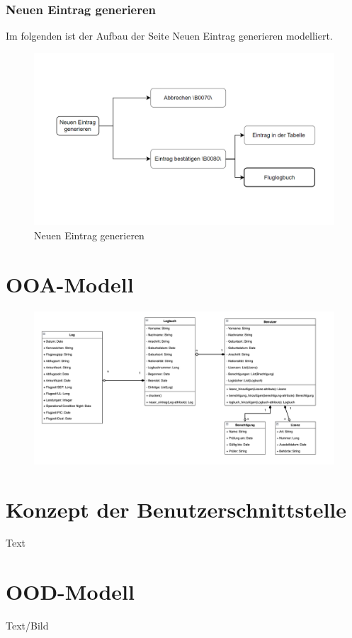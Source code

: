 \documentclass[a4paper]{article} %
\begin{document}
    \subsubsection{Neuen Eintrag generieren}
    \vspace{0.5cm}
    Im folgenden ist der Aufbau der Seite \glqq{}Neuen Eintrag generieren\grqq{} modelliert.
    \begin{figure}[h!]
        \centering
        \includegraphics{Benutzeroberflaeche_Neuer_Eintrag.png}
        \caption{Neuen Eintrag generieren}
        \label{fig:my_label}
    \end{figure}
    
    \pagebreak

    \section{OOA-Modell}
    \begin{figure}[h]
        \centering
        \includegraphics[width=18cm]{Abbildung_OOA.png}
        \label{fig:my_label}
    \end{figure}
    \pagebreak

    \section{Konzept der Benutzerschnittstelle}
    Text
    \pagebreak
    
    \section{OOD-Modell}
    Text/Bild
    \pagebreak
\end{document}
